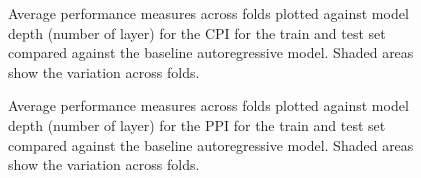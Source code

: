 \begin{figure}


\caption{\label{fig-cpi-b}Average performance measures across folds plotted against model depth (number of layer) for the CPI for the train and test set compared against the baseline autoregressive model. Shaded areas show the variation across folds.}

\end{figure}%


\begin{figure}


\caption{\label{fig-ppi-b}Average performance measures across folds plotted against model depth (number of layer) for the PPI for the train and test set compared against the baseline autoregressive model. Shaded areas show the variation across folds.}

\end{figure}%


